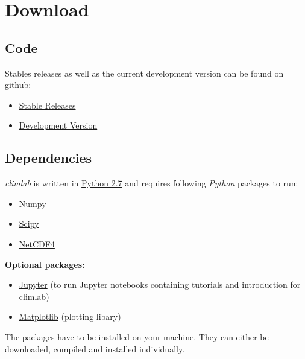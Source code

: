 \documentclass[a4paper,10pt,english]{sphinxmanual}
\begin{document}
\chapter{Download}
\label{download:download}\label{download::doc}

\section{Code}
\label{download:code}
Stables releases as well as the current development version can be found on github:
\begin{itemize}
\item {} 
\href{https://github.com/brian-rose/climlab/releases}{Stable Releases}

\item {} 
\href{https://github.com/brian-rose/climlab}{Development Version}

\end{itemize}


\section{Dependencies}
\label{download:dependencies}
\emph{climlab} is written in \href{https://www.python.org/downloads/}{Python 2.7} and requires following \emph{Python} packages to run:
\begin{itemize}
\item {} 
\href{http://www.numpy.org/}{Numpy}

\item {} 
\href{https://www.scipy.org/}{Scipy}

\item {} 
\href{https://unidata.github.io/netcdf4-python/}{NetCDF4}

\end{itemize}

\textbf{Optional packages:}
\begin{itemize}
\item {} 
\href{http://jupyter.org/}{Jupyter} (to run Jupyter notebooks containing tutorials and introduction for climlab)

\item {} 
\href{http://matplotlib.org/}{Matplotlib} (plotting libary)

\end{itemize}

The packages have to be installed on your machine. They can either be downloaded, compiled and installed individually.
\end{document}
